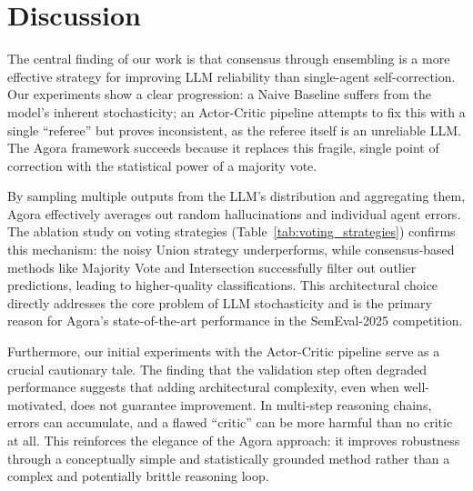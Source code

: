 \section{Discussion}


The central finding of our work is that consensus through ensembling is a more effective strategy for improving LLM reliability than single-agent self-correction. Our experiments show a clear progression: a Naive Baseline suffers from the model's inherent stochasticity; an Actor-Critic pipeline attempts to fix this with a single ``referee'' but proves inconsistent, as the referee itself is an unreliable LLM. The Agora framework succeeds because it replaces this fragile, single point of correction with the statistical power of a majority vote.

By sampling multiple outputs from the LLM's distribution and aggregating them, Agora effectively averages out random hallucinations and individual agent errors. The ablation study on voting strategies (Table~\ref{tab:voting_strategies}) confirms this mechanism: the noisy Union strategy underperforms, while consensus-based methods like Majority Vote and Intersection successfully filter out outlier predictions, leading to higher-quality classifications. This architectural choice directly addresses the core problem of LLM stochasticity and is the primary reason for Agora's state-of-the-art performance in the SemEval-2025 competition.


Furthermore, our initial experiments with the Actor-Critic pipeline serve as a crucial cautionary tale. 
The finding that the validation step often degraded performance suggests that adding architectural complexity, even when well-motivated, does not guarantee improvement. 
In multi-step reasoning chains, errors can accumulate, and a flawed ``critic'' can be more harmful than no critic at all. 
This reinforces the elegance of the Agora approach: it improves robustness through a conceptually simple and statistically grounded method rather than a complex and potentially brittle reasoning loop.